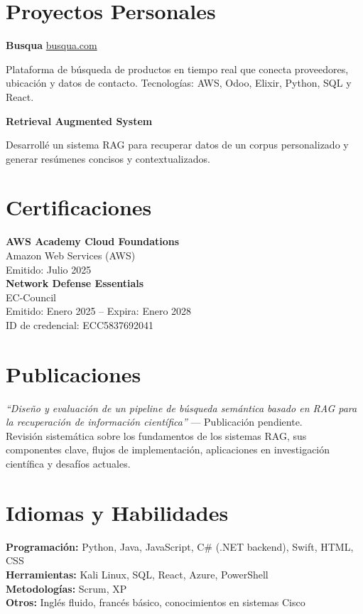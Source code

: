 \documentclass[11pt,a4paper]{article}
\newenvironment{uniformindent}{%
  \begin{list}{}{%
    \setlength{\leftmargin}{2em}
    \setlength{\rightmargin}{0pt}
    \setlength{\topsep}{0pt}
    \setlength{\partopsep}{0pt}
    \setlength{\parsep}{0pt}
    \setlength{\itemsep}{0pt}
  }
  \item[]
}{%
  \end{list}
}
\newenvironment{indentedpar}{%
  \begin{list}{}{%
    \setlength{\leftmargin}{2em}
    \setlength{\rightmargin}{0pt}
    \setlength{\itemsep}{0pt}
    \setlength{\parsep}{0pt}
    \setlength{\topsep}{0pt}
  }
  \item[]
}{%
  \end{list}
}
\begin{document}
\begin{uniformindent}
\section*{Proyectos Personales}

\textbf{Busqua} \hfill \href{https://busqua.com}{busqua.com}
\begin{indentedpar}
Plataforma de b\'usqueda de productos en tiempo real que conecta proveedores, ubicaci\'on y datos de contacto. Tecnolog\'ias: AWS, Odoo, Elixir, Python, SQL y React.
\end{indentedpar}

\textbf{Retrieval Augmented System}
\begin{indentedpar}
Desarroll\'e un sistema RAG para recuperar datos de un corpus personalizado y generar res\'umenes concisos y contextualizados.
\end{indentedpar}

\section*{Certificaciones}

\textbf{AWS Academy Cloud Foundations}\\
Amazon Web Services (AWS) \\ Emitido: Julio 2025\\

\textbf{Network Defense Essentials}\\
EC-Council \\ Emitido: Enero 2025 -- Expira: Enero 2028\\
ID de credencial: ECC5837692041

\section*{Publicaciones}

\textit{``Dise\~no y evaluaci\'on de un pipeline de b\'usqueda sem\'antica basado en RAG para la recuperaci\'on de informaci\'on cient\'ifica''} --- Publicaci\'on pendiente.\\
Revisi\'on sistem\'atica sobre los fundamentos de los sistemas RAG, sus componentes clave, flujos de implementaci\'on, aplicaciones en investigaci\'on cient\'ifica y desaf\'ios actuales.

\section*{Idiomas y Habilidades}

\textbf{Programaci\'on:} Python, Java, JavaScript, C\# (.NET backend), Swift, HTML, CSS\\
\textbf{Herramientas:} Kali Linux, SQL, React, Azure, PowerShell\\
\textbf{Metodolog\'ias:} Scrum, XP\\
\textbf{Otros:} Ingl\'es fluido, franc\'es b\'asico, conocimientos en sistemas Cisco

\end{uniformindent}
\end{document}
